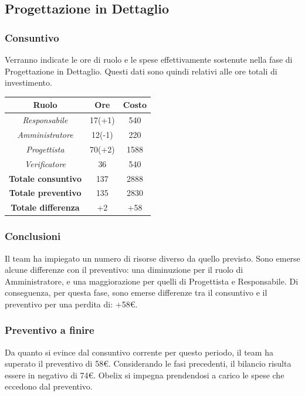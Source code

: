 \subsection{Progettazione in Dettaglio}

\subsubsection{Consuntivo}

Verranno indicate le ore di ruolo e le spese effettivamente sostenute nella fase di Progettazione in Dettaglio. Questi dati sono quindi relativi alle ore totali di investimento.

\begin{center}
	\centering
	\begin{tabular}{|c|c|c|}
		\hline
		\textbf{Ruolo} & \textbf{Ore} & \textbf{Costo} \\
		\hline
		\emph{Responsabile}  & 17(+1) & 540 \\
		\hline  \emph{Amministratore}  & 12(-1) & 220 \\
		\hline  \emph{Progettista}  & 70(+2) & 1588 \\
		\hline  \emph{Verificatore}  & 36 & 540 \\
		\hline
		\textbf{Totale consuntivo} & 137 & 2888 \\
		\hline
		\textbf{Totale preventivo} & 135 & 2830 \\
		\hline
		\textbf{Totale differenza} & +2 & +58 \\
		\hline
	\end{tabular}
	
\end{center}

\subsubsection{Conclusioni}

Il team ha impiegato un numero di risorse diverso da quello previsto. Sono emerse alcune differenze con il preventivo: una diminuzione per il ruolo di Amministratore, e una maggiorazione per quelli di Progettista e Responsabile. Di conseguenza, per questa fase, sono emerse differenze tra il consuntivo e il preventivo per una perdita di: +58€.

\subsubsection{Preventivo a finire}
Da quanto si evince dal consuntivo corrente per questo periodo, il team ha superato il preventivo
di 58€. Considerando le fasi precedenti, il bilancio risulta essere in negativo di 74€. Obelix si impegna prendendosi a carico le spese che eccedono dal preventivo. 

